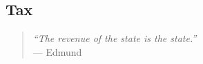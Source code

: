\documentclass[11pt,a4paper,oneside]{article}
\begin{document}
\subsection{Tax}

\begin{quote}
	\emph{``The revenue of the state \emph{is} the state.''}\\
	--- Edmund \citet[111, emphasis added]{Burke1790}
\end{quote}

\end{document}
